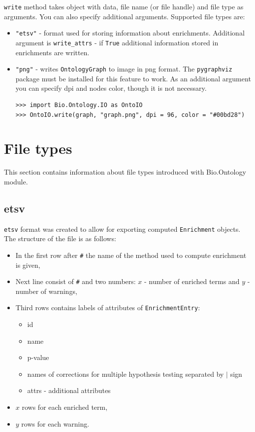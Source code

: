 \documentclass{report}
\begin{document}
\verb|write| method takes object with data, file name (or file handle) and file
type as arguments. You can also specify additional arguments.
Supported file types are:
\begin{itemize}
\item \verb|"etsv"| - format used for storing information about
enrichments. Additional argument is
\verb|write_attrs| - if \verb|True| additional information stored
in enrichments are written.

\item \verb|"png"| - writes \verb|OntologyGraph| to image in png format. The
\verb|pygraphviz| package must be installed for this feature to work. As an
additional argument you can specify dpi and nodes color, though it is not
necessary.
\begin{verbatim}
>>> import Bio.Ontology.IO as OntoIO
>>> OntoIO.write(graph, "graph.png", dpi = 96, color = "#00bd28")
\end{verbatim}

\end{itemize}
\section{File types}
\label{ch:fileformats}
This section contains information about file types introduced with
Bio.Ontology module.
\subsection{etsv}
\verb|etsv| format was created to allow for exporting computed
\verb|Enrichment| objects.
The structure of the file is as follows:
\begin{itemize}
\item In the first row after \verb|#| the name of the method used
to compute enrichment is given,
\item Next line consist of \verb|#| and two numbers: $x$ - number of 
enriched terms and $y$ - number of warnings,
\item Third rows contains labels of attributes of
\verb|EnrichmentEntry|:
\begin{itemize}
\item id
\item name
\item p-value
\item names of corrections for multiple hypothesis testing separated by
$|$ sign
\item attrs - additional attributes
\end{itemize}
\item $x$ rows for each enriched term,
\item $y$ rows for each warning.
\end{itemize}
\end{document}
